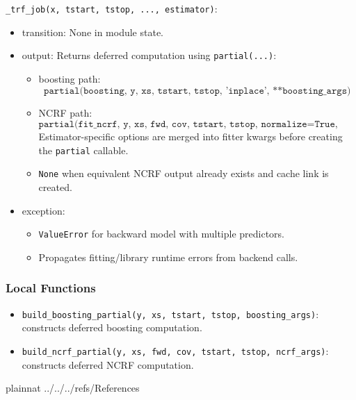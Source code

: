 \documentclass[12pt, titlepage]{article}
\begin{document}
\noindent \texttt{\_trf\_job(x, tstart, tstop, ..., estimator)}:
\begin{itemize}
\item transition: None in module state.
\item output: Returns deferred computation using \texttt{partial(...)}:
\begin{itemize}
\item boosting path:
\[
\texttt{partial(boosting, y, xs, tstart, tstop, 'inplace', **boosting\_args)}
\]
\item NCRF path:
\[
\texttt{partial(fit\_ncrf, y, xs, fwd, cov, tstart, tstop, normalize=True, in\_place=True, **ncrf\_args)}
\]
Estimator-specific options are merged into fitter kwargs before creating the
\texttt{partial} callable.
\item \texttt{None} when equivalent NCRF output already exists and cache link is
created.
\end{itemize}
\item exception:
\begin{itemize}
\item \texttt{ValueError} for backward model with multiple predictors.
\item Propagates fitting/library runtime errors from backend calls.
\end{itemize}
\end{itemize}

\subsubsection{Local Functions}

\begin{itemize}
\item \texttt{build\_boosting\_partial(y, xs, tstart, tstop, boosting\_args)}:
constructs deferred boosting computation.
\item \texttt{build\_ncrf\_partial(y, xs, fwd, cov, tstart, tstop, ncrf\_args)}:
constructs deferred NCRF computation.
\end{itemize}

\newpage

 {plainnat}
 {../../../refs/References}

\newpage



\end{document}
